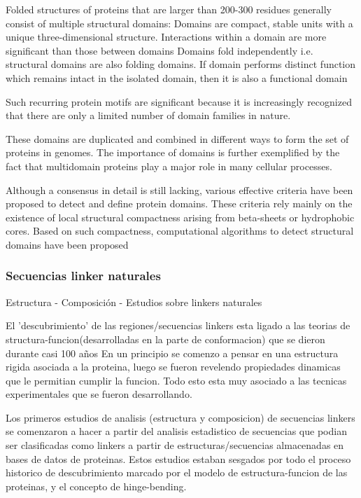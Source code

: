 Folded structures of proteins that are larger than 200-300 residues generally consist of multiple structural domains:
Domains are compact, stable units with a unique three-dimensional structure. 
Interactions within a domain are more significant than those between domains
Domains fold independently i.e. structural domains are also folding domains. If domain performs distinct function which remains intact in the isolated domain, then it is also a functional domain




Such recurring protein motifs are significant because it is increasingly recognized that there are only a limited number of domain families in nature.









These domains are duplicated and combined in different ways to form the set of proteins in genomes. 
The importance of domains is further exemplified by the fact that multidomain proteins play a major role in many cellular processes.

Although a consensus in detail is still lacking, various effective criteria have been proposed to detect and define protein domains.
These criteria rely mainly on the existence of local structural compactness arising from beta-sheets or hydrophobic cores. 
Based on such compactness, computational algorithms to detect structural domains have been proposed








\subsubsection{Secuencias linker naturales}
Estructura - Composición -  Estudios sobre linkers naturales


El 'descubrimiento' de las regiones/secuencias linkers esta ligado a las teorias de structura-funcion(desarrolladas en la parte de conformacion) que se dieron durante casi 100 años
En un principio se comenzo a pensar en una estructura rigida asociada a la proteina, luego se fueron revelendo propiedades dinamicas que le permitian cumplir la funcion. 
Todo esto esta muy asociado a las tecnicas experimentales que se fueron desarrollando.

Los primeros estudios de analisis (estructura y composicion) de secuencias linkers se comenzaron a hacer a partir del analisis estadistico de secuencias que podian ser clasificadas como linkers a partir de estructuras/secuencias almacenadas en bases de datos de proteinas.
Estos estudios estaban sesgados por todo el proceso historico de descubrimiento marcado por el modelo de estructura-funcion de las proteinas, y el concepto de hinge-bending.

